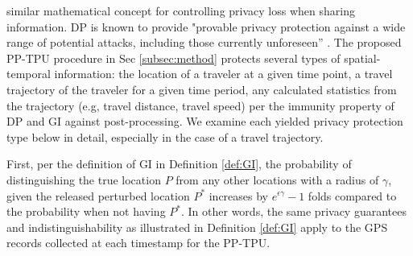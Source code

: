 \documentclass[10pt,journal,compsoc]{IEEEtran}
\begin{document}
similar mathematical concept for controlling privacy loss when sharing information. DP is known to provide "provable privacy protection against a wide range of potential attacks, including those currently unforeseen'' \cite{nissim2017differential,dwork2017exposed}.  The proposed PP-TPU procedure in Sec \ref{subsec:method} protects several types of spatial-temporal information: the location of a traveler at a given time point, a travel trajectory of the traveler for a given time period, any calculated statistics from the trajectory (e.g, travel distance, travel speed) per the immunity property of DP and GI against post-processing. We examine each yielded privacy protection type below in detail, especially in the case  of a travel trajectory.

First, per the definition of GI in Definition \ref{def:GI}, the probability of distinguishing the true location $P$ from any other locations with a radius of $\gamma$, given the released perturbed location $P^*$ increases by $e^{\epsilon\gamma}-1$ folds compared to the probability  when not having $P^*$. In other words, the same privacy guarantees and indistinguishability as illustrated in Definition \ref{def:GI}  apply to the GPS records collected at each timestamp for the PP-TPU. 
\end{document}
